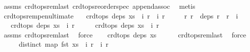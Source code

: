 \begin{isabellebody}
%
\isadelimproof
%
\endisadelimproof
%
\isatagproof
{}\isamarkupfalse%
\ assms\ crdt{\isacharunderscore}ops{\isacharunderscore}rem{\isacharunderscore}last\ crdt{\isacharunderscore}ops{\isacharunderscore}reorder{\isacharunderscore}spec\ append{\isacharunderscore}assoc\ \isamarkupfalse%
\ metis%
\endisatagproof
{\isafoldproof}%
%
\isadelimproof
\isanewline
%
\endisadelimproof
\isanewline
{}\isamarkupfalse%
\ crdt{\isacharunderscore}ops{\isacharunderscore}rem{\isacharunderscore}penultimate{\isacharcolon}\isanewline
\ \ \ {\isachardoublequoteopen}crdt{\isacharunderscore}ops\ deps\ {\isacharparenleft}xs\ {\isacharat}\ {\isacharbrackleft}{\isacharparenleft}i{}{\isacharcomma}\ r{}{\isacharparenright}{\isacharbrackright}\ {\isacharat}\ {\isacharbrackleft}{\isacharparenleft}i{}{\isacharcomma}\ r{}{\isacharparenright}{\isacharbrackright}{\isacharparenright}{\isachardoublequoteclose}\isanewline
\ \ \ \ \ {\isachardoublequoteopen}{\isasymAnd}r{\isachardot}\ r\ {\isasymin}\ deps\ r{}\ {\isasymLongrightarrow}\ r\ {\isasymnoteq}\ i{}{\isachardoublequoteclose}\isanewline
\ \ \ {\isachardoublequoteopen}crdt{\isacharunderscore}ops\ deps\ {\isacharparenleft}xs\ {\isacharat}\ {\isacharbrackleft}{\isacharparenleft}i{}{\isacharcomma}\ r{}{\isacharparenright}{\isacharbrackright}{\isacharparenright}{\isachardoublequoteclose}\isanewline
%
\isadelimproof
%
\endisadelimproof
%
\isatagproof
{}\isamarkupfalse%
\ {\isacharminus}\isanewline
\ \ \isamarkupfalse%
\ {\isachardoublequoteopen}crdt{\isacharunderscore}ops\ deps\ {\isacharparenleft}xs\ {\isacharat}\ {\isacharbrackleft}{\isacharparenleft}i{}{\isacharcomma}\ r{}{\isacharparenright}{\isacharbrackright}{\isacharparenright}{\isachardoublequoteclose}\isanewline
\ \ \ \ \isamarkupfalse%
\ assms{\isacharparenleft}{}{\isacharparenright}\ crdt{\isacharunderscore}ops{\isacharunderscore}rem{\isacharunderscore}last\ \isamarkupfalse%
\ force\isanewline
\ \ \isamarkupfalse%
\ {\isachardoublequoteopen}crdt{\isacharunderscore}ops\ deps\ xs{\isachardoublequoteclose}\isanewline
\ \ \ \ \isamarkupfalse%
\ crdt{\isacharunderscore}ops{\isacharunderscore}rem{\isacharunderscore}last\ \isamarkupfalse%
\ force\isanewline
\ \ \isamarkupfalse%
\ \isamarkupfalse%
\ {\isachardoublequoteopen}distinct\ {\isacharparenleft}map\ fst\ {\isacharparenleft}xs\ {\isacharat}\ {\isacharbrackleft}{\isacharparenleft}i{}{\isacharcomma}\ r{}{\isacharparenright}{\isacharbrackright}\ {\isacharat}\ {\isacharbrackleft}{\isacharparenleft}i{}{\isacharcomma}\ r{}{\isacharparenright}{\isacharbrackright}{\isacharparenright}{\isacharparenright}{\isachardoublequoteclose}\isanewline

\end{isabellebody}
